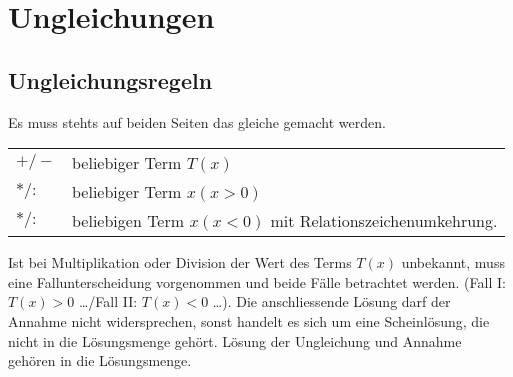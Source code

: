 \section{Ungleichungen}
\subsection{Ungleichungsregeln}
Es muss stehts auf beiden Seiten das gleiche gemacht werden.
\settowidth{\MyLenA}{$+/-$~~}
\begin{tabular}{@{}p{\the\MyLenA}%
				@{}p{\linewidth-\the\MyLenA}}
	$+/-$	& beliebiger Term $T(x)$\\
	$*/:$ 	& beliebiger Term $x (x > 0)$\\
	$*/:$ 	& beliebigen Term $x (x < 0)$ mit Relationszeichenumkehrung.\\ 
\end{tabular}
Ist bei Multiplikation oder Division der Wert des Terms $T(x)$ unbekannt, muss eine Fallunterscheidung vorgenommen und beide Fälle betrachtet werden.
(Fall I: $T(x) > 0$ \dots/Fall II: $T(x) < 0$ \dots). Die anschliessende Lösung darf der Annahme nicht widersprechen, sonst handelt es sich um eine Scheinlösung,
die nicht in die Lösungsmenge gehört. Lösung der Ungleichung und Annahme gehören in die Lösungsmenge.